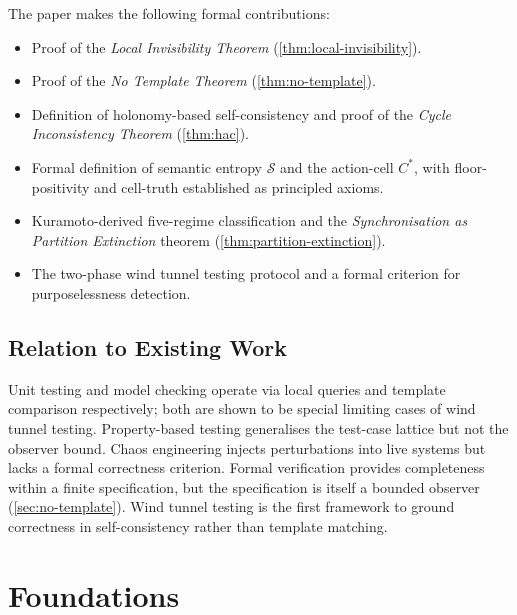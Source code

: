 \documentclass[twocolumn,a4paper,11pt]{article}
\theoremstyle{plain}
\theoremstyle{definition}
\theoremstyle{remark}
\begin{document}
The paper makes the following formal contributions:
\begin{itemize}[leftmargin=*]
  \item Proof of the \emph{Local Invisibility Theorem}
        (\cref{thm:local-invisibility}).
  \item Proof of the \emph{No Template Theorem}
        (\cref{thm:no-template}).
  \item Definition of holonomy-based self-consistency and proof of the
        \emph{Cycle Inconsistency Theorem} (\cref{thm:hac}).
  \item Formal definition of semantic entropy $\mathcal{S}$ and the
        action-cell $C^*$, with floor-positivity and cell-truth
        established as principled axioms.
  \item Kuramoto-derived five-regime classification and the
        \emph{Synchronisation as Partition Extinction} theorem
        (\cref{thm:partition-extinction}).
  \item The two-phase wind tunnel testing protocol and a formal criterion
        for purposelessness detection.
\end{itemize}

\subsection{Relation to Existing Work}

Unit testing \cite{myers1979} and model checking \cite{clarke1981} operate
via local queries and template comparison respectively; both are shown to
be special limiting cases of wind tunnel testing. Property-based testing
\cite{claessen2000} generalises the test-case lattice but not the observer
bound. Chaos engineering \cite{basiri2016} injects perturbations into live
systems but lacks a formal correctness criterion. Formal verification
\cite{clarke1981} provides completeness within a finite specification, but
the specification is itself a bounded observer (\cref{sec:no-template}).
Wind tunnel testing is the first framework to ground correctness in
self-consistency rather than template matching.

\section{Foundations}
\label{sec:foundations}
\end{document}
